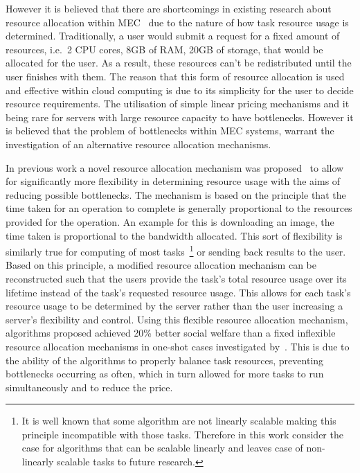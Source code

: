 However it is believed that there are shortcomings in existing research about resource allocation within
MEC~\citep{vaji_infocom, Bi2019} due to the nature of how task resource usage is determined. Traditionally,
a user would submit a request for a fixed amount of resources, i.e.\ 2 CPU cores, 8GB of RAM, 20GB of storage, that
would be allocated for the user. As a result, these resources can't be redistributed until the user finishes with them.
The reason that this form of resource allocation is used and effective within cloud computing is due to its simplicity
for the user to decide resource requirements. The utilisation of simple linear pricing mechanisms and it being rare for
servers with large resource capacity to have bottlenecks. However it is believed that the problem of bottlenecks within
MEC systems, warrant the investigation of an alternative resource allocation mechanisms.

In previous work a novel resource allocation mechanism was proposed~\citep{FlexibleResourceAllocation} to allow for
significantly more flexibility in determining resource usage with the aims of reducing possible
bottlenecks. The mechanism is based on the principle that the time taken for an operation to complete is generally
proportional to the resources provided for the operation. An example for this is downloading an image, the time taken
is proportional to the bandwidth allocated. This sort of flexibility is similarly true for computing of most
tasks~\footnote{It is well known that some algorithm are not linearly scalable making this principle incompatible with
those tasks. Therefore in this work consider the case for algorithms that can be scalable linearly and leaves case of
non-linearly scalable tasks to future research.} or sending back results to the user. \\
Based on this principle, a modified resource allocation mechanism can be
reconstructed such that the users provide the task's total resource usage over its lifetime instead of the task's
requested resource usage. This allows for each task's resource usage to be determined by the server rather than the user
increasing a server's flexibility and control. Using this flexible resource allocation mechanism, algorithms proposed achieved 20\%
better social welfare than a fixed inflexible resource allocation mechanisms in one-shot cases investigated by~\cite{FlexibleResourceAllocation}.
This is due to the ability of the algorithms to properly balance task resources, preventing bottlenecks occurring as often, which in turn allowed
for more tasks to run simultaneously and to reduce the price.

